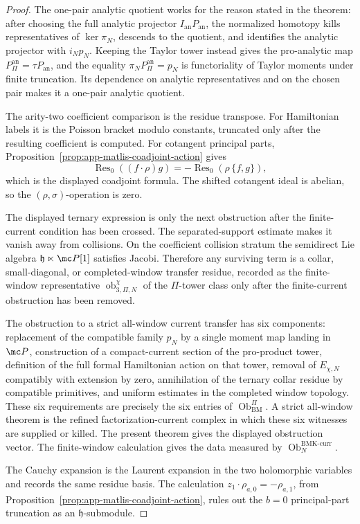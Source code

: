 \begin{proof}
  The one-pair analytic quotient works for the reason stated in the
  theorem: after choosing the full analytic projector \(I_{\mathrm{an}}
  P_{\mathrm{an}}\), the normalized homotopy kills representatives of
  \(\ker\pi_N\), descends to the quotient, and identifies the analytic
  projector with \(i_Np_N\).  Keeping the Taylor tower instead gives the
  pro-analytic map \(P_{\Pi}^{\mathrm{an}}=\tau P_{\mathrm{an}}\), and
  the equality \(\pi_NP_{\Pi}^{\mathrm{an}}=p_N\) is functoriality
  of Taylor moments under finite truncation.  Its dependence on analytic
  representatives and on the chosen pair makes it a one-pair analytic
  quotient.

  The arity-two coefficient comparison is the residue transpose.  For
  Hamiltonian labels it is the Poisson bracket modulo constants,
  truncated only after the resulting coefficient is computed.  For cotangent
  principal parts, Proposition~\ref{prop:app-matlis-coadjoint-action}
  gives
  \[
    \operatorname{Res}_0((f\cdot\rho)g)
      =
      -\operatorname{Res}_0(\rho\,\{f,g\}),
  \]
  which is the displayed coadjoint formula.  The shifted cotangent ideal
  is abelian, so the \((\rho,\sigma)\)-operation is zero.

  The displayed ternary expression is only the next obstruction after the
  finite-current condition has been crossed.  The separated-support estimate
  makes it vanish away from collisions.  On the coefficient collision
  stratum the semidirect Lie algebra \(\mathfrak h\ltimes\mc P[1]\)
  satisfies Jacobi.  Therefore any surviving term is a collar,
  small-diagonal, or completed-window transfer residue, recorded as the
  finite-window representative \(\operatorname{ob}^{\chi}_{3,\Pi,N}\)
  of the \(\Pi\)-tower class only after the finite-current
  obstruction has been removed.

  The obstruction to a strict all-window current transfer has six
  components: replacement of the compatible family \(p_N\) by a single
  moment map landing in \(\mc P\), construction of a compact-current
  section of the pro-product tower, definition of the full formal
  Hamiltonian action on that tower, removal of \(E_{\chi,N}\) compatibly
  with extension by zero, annihilation of the ternary collar residue by
  compatible primitives, and uniform estimates in the completed window
  topology.  These six requirements are
  precisely the six entries of \(\operatorname{Ob}^{\Pi}_{\mathrm{BM}}\).
  A strict all-window theorem is the refined factorization-current
  complex in which these six witnesses are supplied or killed.  The
  present theorem gives the displayed obstruction vector.
  The finite-window calculation gives the data measured by
  \(\operatorname{Ob}^{\mathrm{BMK\mbox{-}curr}}_N\).

  The Cauchy expansion is the Laurent expansion in the two holomorphic
  variables and records the same residue basis.  The calculation
  \(z_1\cdot\rho_{a,0}=-\rho_{a,1}\), from
  Proposition~\ref{prop:app-matlis-coadjoint-action}, rules out the
  \(b=0\) principal-part truncation as an \(\mathfrak h\)-submodule.
\end{proof}

